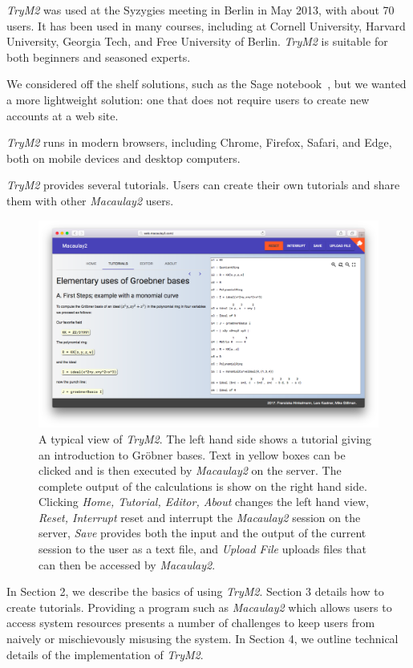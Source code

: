 \documentclass[twocolumn]{article}
\def\trym2{{\it TryM2}}
\def\M2{{\it Macaulay2}}
\begin{document}
\trym2 was used at the Syzygies
meeting in Berlin in May 2013, with about 70 users. It has been used in many courses, including at Cornell
University, Harvard University, Georgia Tech, and Free University of
Berlin. \trym2 is suitable for both beginners and seasoned experts.

We considered off the shelf solutions, such as the Sage
notebook~\cite{sagenotebook}, but we wanted a more
lightweight solution: one that does not require users to create
new accounts at a web site.

\trym2 runs in modern browsers, including Chrome, Firefox, Safari, and Edge, both on mobile devices and desktop
computers.

\trym2 provides several tutorials. Users can create their own
tutorials and share them with other \M2 users.

\begin{figure}[htb]
    \includegraphics[width=.99\textwidth]{homeWebsite.jpg}
    \caption{A typical view of \trym2. The left hand
        side shows a tutorial giving an introduction to Gr\"obner
        bases. Text in yellow boxes can be clicked and is then executed by
        \M2 on the server. The complete output of the calculations
        is show on the right hand side. Clicking {\it Home, Tutorial, Editor, About}
        changes the left hand view, {\it Reset, Interrupt}
        reset and interrupt the \M2 session on the server, {\it
        Save} provides both the input and the output of the current
        session to the user as a text file, and {\it Upload File} uploads files
        that can then be accessed by \M2.}
\label{fig:home}
\end{figure}

In Section 2, we describe the basics of using \trym2.
Section 3 details how to create tutorials.
Providing a program such as \M2 which allows users to
access system resources presents a number of challenges to keep users
from naively or mischievously misusing the system.  In Section 4, we
outline technical details of the implementation of \trym2.
\end{document}
